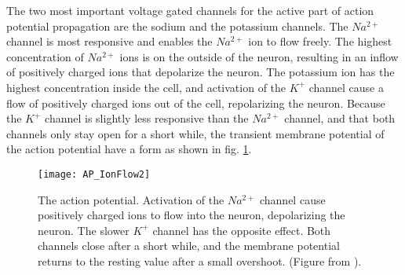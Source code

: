 		The two most important voltage gated channels for the active part of action potential propagation are the sodium and the potassium channels.
		The $Na^{2+}$ channel is most responsive and enables the $Na^{2+}$ ion to flow freely. %
		The highest concentration of $Na^{2+}$ ions is on the outside of the neuron, resulting in an inflow of positively charged ions that depolarize the neuron.
		The potassium ion has the highest concentration inside the cell, and activation of the $K^+$ channel cause a flow of positively charged ions out of the cell, repolarizing the neuron.
		Because the $K^+$ channel is slightly less responsive than the $Na^{2+}$ channel, and that both channels only stay open for a short while, 
			the transient membrane potential of the action potential have a form as shown in fig. \ref{figActionPotential}. 
		\cite{PrinciplesOfNeuralScience4edKAP09}
	

\begin{figure}[hbt!p]
    \centering
    \texttt{[image: AP\_IonFlow2]}
 	  \caption[The transient axon membrane potential from an action potential]
				{The action potential. Activation of the $Na^{2+}$ channel cause positively charged ions to flow into the neuron, depolarizing the neuron. The slower $K^+$ channel has the opposite effect.
				Both channels close after a short while, and the membrane potential returns to the resting value after a small overshoot.
				(Figure from \cite{PrinciplesOfNeuralScience4edKAP09}).
			}
    \label{figActionPotential}
\end{figure}



